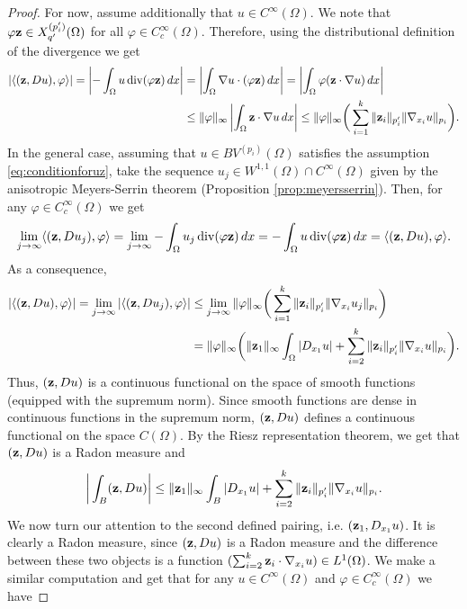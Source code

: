 \documentclass[reqno,12pt]{amsart}
\def\z{{\bf z}}
\numberwithin{equation}{section}
\begin{document}
\begin{proof}
For now, assume additionally that $u \in C^\infty(\Omega)$. We note that  $\varphi \z \in X_{q'}^{(p'_i)}(\Omega)$ for all $\varphi \in C_c^\infty(\Omega)$. Therefore, using the distributional definition of the divergence we get
\begin{align}
|\langle (\z, Du), \varphi \rangle| = \left|-\int_{\Omega} u \, \mathrm{div}(\varphi \z) \, dx \right| &=  \left|\int_{\Omega} \nabla u \cdot (\varphi \z) \, dx \right| = \left|\int_{\Omega} \varphi (\z \cdot \nabla u) \, dx \right| \\
&\leq \| \varphi \|_\infty \left| \int_{\Omega} \z \cdot \nabla u \, dx \right| \leq \| \varphi \|_\infty \bigg( \sum_{i = 1}^k \| \z_i \|_{p'_i}  \| \nabla_{x_i} u \|_{p_i} \bigg).
\end{align}
In the general case, assuming that $u \in BV^{(p_i)}(\Omega)$ satisfies the assumption \eqref{eq:conditionforuz}, take the sequence $u_j \in W^{1,1}(\Omega) \cap C^\infty(\Omega)$ given by the anisotropic Meyers-Serrin theorem (Proposition \ref{prop:meyersserrin}). Then, for any $\varphi \in C_c^\infty(\Omega)$ we get
$$
\lim_{j \rightarrow \infty} \langle (\z, Du_j), \varphi \rangle = \lim_{j \rightarrow \infty} -\int_{\Omega} u_j \, \mathrm{div}(\varphi \z) \, dx = - \int_{\Omega} u \, \mathrm{div}(\varphi \z)  \, dx  = \langle (\z, Du), \varphi \rangle.$$
As a consequence,
\begin{align}
|\langle (\z, Du), \varphi \rangle| = \lim_{j \rightarrow \infty} |\langle (\z, Du_j), \varphi \rangle| &\leq \lim_{j \rightarrow \infty} \| \varphi \|_\infty \bigg( \sum_{i = 1}^k \| \z_i \|_{p'_i}  \| \nabla_{x_i} u_j \|_{p_i} \bigg) \\
&= \| \varphi \|_\infty \bigg( \| \z_1 \|_\infty \int_\Omega |D_{x_1} u| + \sum_{i = 2}^k \| \z_i \|_{p'_i}  \| \nabla_{x_i} u \|_{p_i} \bigg).
\end{align}
Thus, $(\z, Du)$ is a continuous functional on the space of smooth functions (equipped with the supremum norm). Since smooth functions are dense in continuous functions in the supremum norm, $(\z, Du)$ defines a continuous functional on the space $C(\Omega)$. By the Riesz representation theorem, we get that $(\z, Du)$ is a Radon measure and
\begin{equation}
\bigg\vert \int_{B} (\z,Du) \bigg\vert \leq \| \z_1 \|_{\infty} \int_{B} \vert D_{x_1} u \vert + \sum_{i=2}^k \| \z_i \|_{p'_i} \| \nabla_{x_i} u \|_{p_i}.
\end{equation}
We now turn our attention to the second defined pairing, i.e. $(\z_1, D_{x_1} u)$. It is clearly a Radon measure, since $(\z,Du)$ is a Radon measure and the difference between these two objects is a function $(\sum_{i=2}^k \z_i \cdot \nabla_{x_i} u) \in L^1(\Omega)$. We make a similar computation and get that for any $u \in C^\infty(\Omega)$ and $\varphi \in C_c^\infty(\Omega)$ we have

\end{proof}
\end{document}

